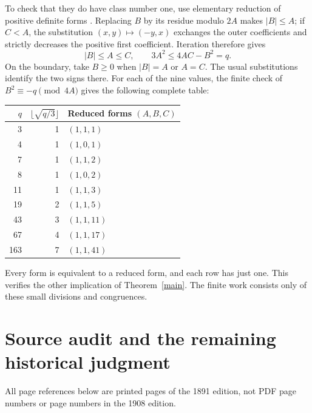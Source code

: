 \documentclass[11pt]{article}
\begin{document}
To check that they do have class number one, use elementary reduction
of positive definite forms \cite{gauss}. Replacing \(B\) by its
residue modulo \(2A\) makes \(|B|\le A\); if \(C<A\), the
substitution \((x,y)\mapsto(-y,x)\) exchanges the outer
coefficients and strictly decreases the positive first coefficient.
Iteration therefore gives
\[
 |B|\le A\le C,\qquad 3A^2\le4AC-B^2=q.
\]
On the boundary, take \(B\ge0\) when \(|B|=A\) or \(A=C\).
The usual substitutions identify the two signs there. For each of the
nine values, the finite check of
\(B^2\equiv-q\pmod{4A}\) gives the following complete table:
\begin{center}
\begin{tabular}{rrl}
\toprule
\(q\)&\(\lfloor\sqrt{q/3}\rfloor\)&Reduced forms \((A,B,C)\)\\
\midrule
3&1&\((1,1,1)\)\\
4&1&\((1,0,1)\)\\
7&1&\((1,1,2)\)\\
8&1&\((1,0,2)\)\\
11&1&\((1,1,3)\)\\
19&2&\((1,1,5)\)\\
43&3&\((1,1,11)\)\\
67&4&\((1,1,17)\)\\
163&7&\((1,1,41)\)\\
\bottomrule
\end{tabular}
\end{center}
Every form is equivalent to a reduced form, and each row has just one.
This verifies the other implication of Theorem~\ref{main}. The finite
work consists only of these small divisions and congruences.

\clearpage
\section{Source audit and the remaining historical judgment}\label{audit}

All page references below are printed pages of the 1891 edition, not
PDF page numbers or page numbers in the 1908 edition.
\end{document}
